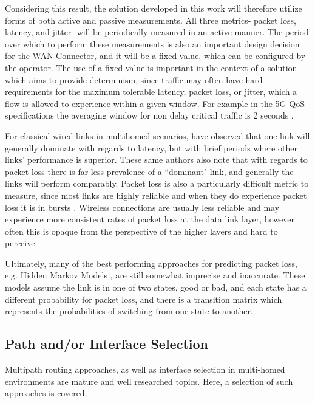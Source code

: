 Considering this result, the solution developed in this work will therefore utilize forms of both active and passive measurements. All three metrics- packet loss, latency, and jitter- will be periodically measured in an active manner. The period over which to perform these measurements is also an important design decision for the WAN Connector, and it will be a fixed value, which can be configured by the operator. The use of a fixed value is important in the context of a solution which aims to provide determinism, since traffic may often have hard requirements for the maximum tolerable latency, packet loss, or jitter, which a flow is allowed to experience within a given window. For example in the 5G QoS specifications the averaging window for non delay critical traffic is 2 seconds \cite{3gpp.23.501}.

For classical wired links in multihomed scenarios, \cite{tao2004exploring} have observed that one link will generally dominate with regards to latency, but with brief periods where other links' performance is superior. These same authors also note that with regards to packet loss there is far less prevalence of a “dominant" link, and generally the links will perform comparably. Packet loss is also a particularly difficult metric to measure, since most links are highly reliable and when they do experience packet loss it is in bursts \cite{tao2004exploring}. Wireless connections are usually less reliable and may experience more consistent rates of packet loss at the data link layer, however often this is opaque from the perspective of the higher layers and hard to perceive.

Ultimately, many of the best performing approaches for predicting packet loss, e.g. Hidden Markov Models \cite{tao2004exploring, bremler2002predicting}, are still somewhat imprecise and inaccurate. These models assume the link is in one of two states, good or bad, and each state has a different probability for packet loss, and there is a transition matrix which represents the probabilities of switching from one state to another.

\subsection{Path and/or Interface Selection}

Multipath routing approaches, as well as interface selection in multi-homed environments are mature and well researched topics. Here, a selection of such approaches is covered.

